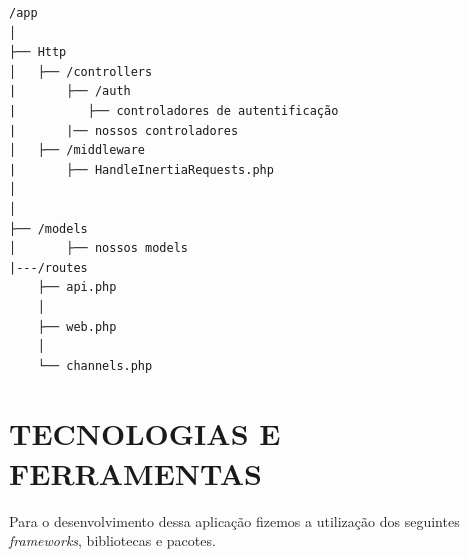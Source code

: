 \begin{verbatim}
/app
│
├── Http
│   ├── /controllers  
|       ├── /auth
|          ├── controladores de autentificação
|       |── nossos controladores
│   ├── /middleware
|       ├── HandleInertiaRequests.php
│               
│
├── /models                 
│       ├── nossos models
|---/routes
    ├── api.php             
    │
    ├── web.php                
    │
    └── channels.php               
\end{verbatim}







\section{TECNOLOGIAS E FERRAMENTAS}
Para o desenvolvimento dessa aplicação fizemos a utilização dos seguintes \textit{frameworks}, bibliotecas e pacotes.

